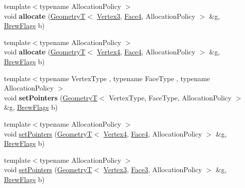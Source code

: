 \begin{DoxyCompactItemize}
\item 
\hypertarget{classs9_1_1gl_1_1Drawable_a9df92ec26ccfddc5a49b9f440e62c69f}{{\footnotesize template$<$typename Allocation\-Policy $>$ }\\void {\bfseries allocate} (\hyperlink{classs9_1_1GeometryT}{Geometry\-T}$<$ \hyperlink{structs9_1_1VertexT}{Vertex3}, \hyperlink{structs9_1_1FaceT}{Face4}, Allocation\-Policy $>$ \&g, \hyperlink{structs9_1_1gl_1_1BrewFlags}{Brew\-Flags} b)}\label{classs9_1_1gl_1_1Drawable_a9df92ec26ccfddc5a49b9f440e62c69f}

\item 
\hypertarget{classs9_1_1gl_1_1Drawable_a6033b5801d330cd6fa2994fc8a77fab6}{{\footnotesize template$<$typename Allocation\-Policy $>$ }\\void {\bfseries allocate} (\hyperlink{classs9_1_1GeometryT}{Geometry\-T}$<$ \hyperlink{structs9_1_1VertexT}{Vertex4}, \hyperlink{structs9_1_1FaceT}{Face4}, Allocation\-Policy $>$ \&g, \hyperlink{structs9_1_1gl_1_1BrewFlags}{Brew\-Flags} b)}\label{classs9_1_1gl_1_1Drawable_a6033b5801d330cd6fa2994fc8a77fab6}

\item 
\hypertarget{classs9_1_1gl_1_1Drawable_a9cf81e2a6d53700488217b215a5d741f}{{\footnotesize template$<$typename Vertex\-Type , typename Face\-Type , typename Allocation\-Policy $>$ }\\void {\bfseries set\-Pointers} (\hyperlink{classs9_1_1GeometryT}{Geometry\-T}$<$ Vertex\-Type, Face\-Type, Allocation\-Policy $>$ \&g, \hyperlink{structs9_1_1gl_1_1BrewFlags}{Brew\-Flags} b)}\label{classs9_1_1gl_1_1Drawable_a9cf81e2a6d53700488217b215a5d741f}

\item 
{\footnotesize template$<$typename Allocation\-Policy $>$ }\\void \hyperlink{classs9_1_1gl_1_1Drawable_a82268b69a4127ccea73e20d14e9a4835}{set\-Pointers} (\hyperlink{classs9_1_1GeometryT}{Geometry\-T}$<$ \hyperlink{structs9_1_1VertexT}{Vertex4}, \hyperlink{structs9_1_1FaceT}{Face4}, Allocation\-Policy $>$ \&g, \hyperlink{structs9_1_1gl_1_1BrewFlags}{Brew\-Flags} b)
\item 
{\footnotesize template$<$typename Allocation\-Policy $>$ }\\void \hyperlink{classs9_1_1gl_1_1Drawable_ad1e1197c103a410e4a606dfda9e6810d}{set\-Pointers} (\hyperlink{classs9_1_1GeometryT}{Geometry\-T}$<$ \hyperlink{structs9_1_1VertexT}{Vertex3}, \hyperlink{structs9_1_1FaceT}{Face3}, Allocation\-Policy $>$ \&g, \hyperlink{structs9_1_1gl_1_1BrewFlags}{Brew\-Flags} b)
\end{DoxyCompactItemize}
